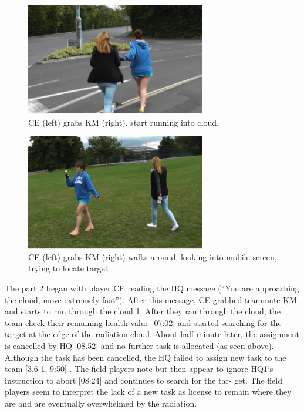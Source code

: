 \begin{figure}[h]
\centering

\includegraphics[width=0.7\textwidth]{img/study3/ep361}
\caption{CE (left) grabs KM (right), start running into cloud. }
\label{fig:ep361}
\end{figure}

\begin{figure}[h]
\centering
 \includegraphics[width=0.7\textwidth]{img/study3/ep362}
\caption{CE (left) grabs KM (right) walks around, looking into mobile screen, trying to locate target}
\label{fig:ep362}

\end{figure}

The part 2 began with player CE reading the HQ message (``You are approaching the cloud, move extremely fast''). After this message, CE grabbed teammate KM and starts to run through the cloud \ref{fig:ep361}.  After they ran through the cloud, the team check their remaining health value [07:02] and started searching for the target at the edge of the radiation cloud. About half minute later, the assignment is cancelled by HQ [08.52] and no further task is allocated (as seen above). Although the task has been cancelled, the HQ failed to assign new task to the team [3.6-1, 9:50] . The field players note but then appear to ignore HQ1`s instruction to abort [08:24] and continues to search for the tar- get. The field players seem to interpret the lack of a new task as license to remain where they are and are eventually overwhelmed by the radiation.\\

